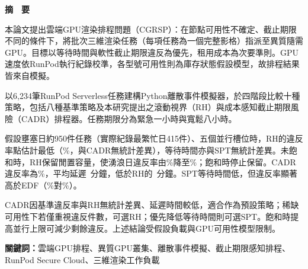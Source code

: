 \newpage
{}

\begin{center}
{\fontsize{20}{24}\selectfont\textbf{摘　要}}
\end{center}

\vspace{20pt}

本論文提出雲端GPU渲染排程問題（CGRSP）：在節點可用性不確定、截止期限不同的條件下，將批次三維渲染任務（每項任務為一個完整影格）指派至異質隨需GPU。目標以等待時間與軟性截止期限違反為優先，租用成本為次要準則。GPU速度依RunPod執行紀錄校準，各型號可用性則為庫存狀態假設模型，故排程結果皆來自模擬。

以6,234筆RunPod Serverless任務建構Python離散事件模擬器，於四階段比較十種策略，包括八種基準策略及本研究提出之滾動視界（RH）與成本感知截止期限風險（CADR）排程器。任務期限分為緊急一小時與寬鬆八小時。

假設壅塞日約950件任務（實際紀錄最繁忙日415件）、五個並行槽位時，RH的違反率點估計最低（\RHMiss\%，與CADR無統計差異），等待時間亦與SPT無統計差異。未飽和時，RH保留閒置容量，使湧浪日違反率由\ResSurgeOffMiss\%降至\ResSurgeOnMiss\%；飽和時停止保留。CADR違反率為\CADRmiss\%，平均延遲\CADRtard~分鐘，低於RH的\RHtard~分鐘。SPT等待時間低，但違反率顯著高於EDF（\SPTmiss\%對\EDFmiss\%）。

CADR因基準違反率與RH無統計差異、延遲時間較低，適合作為預設策略；稀缺可用性下若僅重視違反件數，可選RH；優先降低等待時間則可選SPT。飽和時提高並行上限可減少剩餘違反。上述結論受假設負載與GPU可用性模型限制。

\vspace{0.5cm}
\noindent\textbf{關鍵詞：}雲端GPU排程、異質GPU叢集、離散事件模擬、截止期限感知排程、RunPod Secure Cloud、三維渲染工作負載
